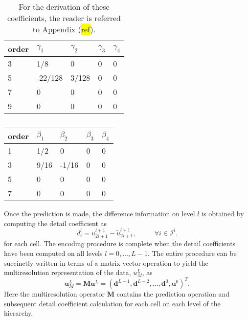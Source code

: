 \documentclass[12pt,letterpaper]{article}
\begin{document}
        \begin{table}[]
            \center
            \begin{tabular}{|l|l|l|l|l|}
            \hline
                order    & $\gamma_{1}$ & $\gamma_{2}$ & $\gamma_{3}$ & $\gamma_{4}$ \\ \hline
                3 & 1/8          & 0            & 0            & 0            \\ \hline
                5 & -22/128      & 3/128        & 0            & 0            \\ \hline
                7 & 0            & 0            & 0            & 0            \\ \hline
                9 & 0            & 0            & 0            & 0            \\ \hline
            \end{tabular}
            \label{coeff1}
            \caption{For the derivation of these coefficients, the reader is referred to Appendix (\hl{ref}).}
        \end{table}

        \begin{table}[]
            \center
            \begin{tabular}{|l|l|l|l|l|}
            \hline
                order    & $\beta_{1}$ & $\beta_{2}$ & $\beta_{3}$ & $\beta_{4}$ \\ \hline
                1 & 1/2          & 0            & 0            & 0            \\ \hline
                3 & 9/16         & -1/16        & 0            & 0            \\ \hline
                5 & 0            & 0            & 0            & 0            \\ \hline
                7 & 0            & 0            & 0            & 0            \\ \hline
            \end{tabular}
            \label{coeff1}
            \caption{}
        \end{table}
        Once the prediction is made, the difference information on level $l$ is
        obtained by computing the detail coefficient as
        \begin{equation}
            d^{l}_{i} = u^{l+1}_{2i+1} - \tilde{u}^{l+1}_{2i+1}, \text{ } \text{ } \text{ } \text{ } \forall i \in \mathcal{I}^{l}.
        \end{equation}
        for each cell.  The encoding procedure is complete when the detail
        coefficients have been computed on all levels $l=0,\dots,L-1$.  The
        entire procedure can be succinctly written in terms of a matrix-vector
        operation to yield the multiresolution representation of the data,
        $u_{M}^{L}$, as
        \begin{equation}
            \bm{u}^{L}_{M} = \bm{M} \bm{u}^{L} = \left( \bm{d}^{L-1}, \bm{d}^{L-2},
            \dots, \bm{d}^{0}, \bm{u}^{0} \right)^{T}.
        \end{equation}
        Here the multiresolution operator $\bm{M}$ contains the prediction
        operation and subsequent detail coefficient calculation for each cell
        on each level of the hierarchy.
\end{document}
